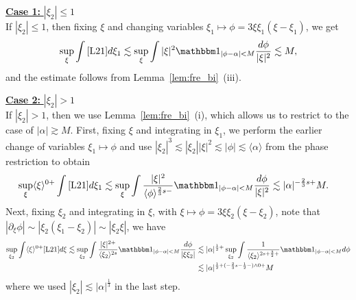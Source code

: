 \documentclass[%
11pt,  reqno]{amsart}
\newcommand{\5}{\textup{V}}
\newcommand{\noi}{\noindent}
\newcommand{\ind}{\mathbbm 1}
\newcommand{\les}{\lesssim}
\theoremstyle{remark}
\newcommand{\al}{\alpha}
\newcommand{\ges}{\gtrsim}
\newcommand{\jb}[1]
{\langle #1 \rangle}
\numberwithin{equation}{section}
\numberwithin{theorem}{section}
\begin{document}
\smallskip

\noi\underline{\textbf{Case 1:} $|\xi_2| \le 1$}\\
If $|\xi_2| \le 1$, then fixing $\xi$ and changing variables $\xi_1 \mapsto \phi = 3 \xi\xi_1(\xi-\xi_1)$, we get
\begin{align}\label{eq:estL21}
    \sup_\xi \int \eqref{L21} d\xi_1
    \les \sup_\xi \int |\xi|^2 \ind_{|\phi - \al| < M } \frac{d\phi}{|\xi|^2 } \les M , 
\end{align}
and the estimate follows from Lemma~\ref{lem:fre_bi}~(iii).

\smallskip 

\noi\underline{\textbf{Case 2:} $|\xi_2| > 1$}\\
If $|\xi_2| >1$, then we use Lemma~\ref{lem:fre_bi}~(i), which allows us to restrict to the case of $|\al| \ges M$. 
First, fixing $\xi$ and integrating in $\xi_1$, we perform the earlier change of variables $\xi_1 \mapsto \phi$ and use $|\xi_2|^3 \les |\xi_2| |\xi|^2 \les |\phi| \les \jb{\al}$ from the phase restriction to obtain
\begin{align}
    \sup_{\xi} \jb{\xi}^{0+}\int \eqref{L21} d\xi_1
    &
    \les 
    \sup_\xi 
    \int \frac{|\xi|^{2}}{\jb{\phi}^{\frac23s-}} \ind_{|\phi-\al| < M} \frac{d\phi}{|\xi|^2} 
    \les |\al|^{-\frac23 s+} M . 
\end{align}
Next, fixing $\xi_2$ and integrating in $\xi$, with $\xi \mapsto \phi = 3\xi \xi_2 (\xi-\xi_2)$, note that $|\partial_\xi \phi| \sim |\xi_2 (\xi_1-\xi_2)| \sim |\xi_2 \xi|$, we have
\begin{align}
\sup_{\xi_2} \int \jb{\xi}^{0+} \eqref{L21} d\xi 
\les \sup_{\xi_2} \int \frac{|\xi|^{2+}}{\jb{\xi_2}^{2s}} \ind_{|\phi-\al| < M} \frac{d\phi}{|\xi\xi_2|} 
&
\les 
|\al|^{\frac12+}
\sup_{\xi_2} \int \frac{1}{\jb{\xi_2}^{2s+\frac32+}} \ind_{|\phi-\al| < M } d\phi
\\
&
\les
|\al|^{\frac12 + (-\frac23 s - \frac12 -) \land 0 
+ } M
\end{align}
where we used $|\xi_2| \les |\al|^{\frac13}$ in the last step. 
\end{document}
